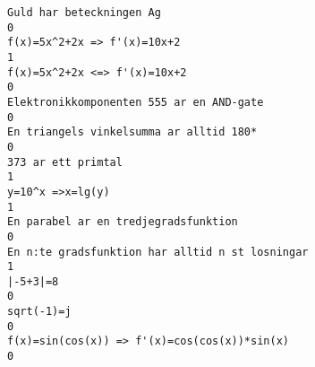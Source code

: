 \begin{verbatim}
Guld har beteckningen Ag
0
f(x)=5x^2+2x => f'(x)=10x+2
1
f(x)=5x^2+2x <=> f'(x)=10x+2
0
Elektronikkomponenten 555 ar en AND-gate
0
En triangels vinkelsumma ar alltid 180*
0
373 ar ett primtal
1
y=10^x =>x=lg(y)
1
En parabel ar en tredjegradsfunktion
0
En n:te gradsfunktion har alltid n st losningar
1
|-5+3|=8
0
sqrt(-1)=j
0
f(x)=sin(cos(x)) => f'(x)=cos(cos(x))*sin(x)
0
\end{verbatim}